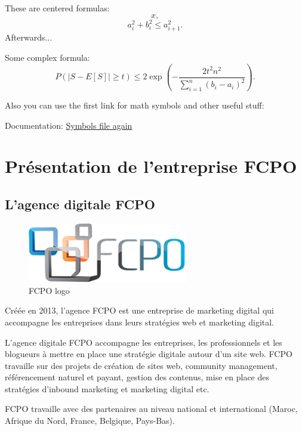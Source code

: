 These are centered formulas: $$x,$$ $$a_i^2 + b_i^2 \le a_{i+1}^2.$$ Afterwards...

Some complex formula: $$P(|S - E[S]| \ge t) \le 2 \exp \left( -\frac{2 t^2 n^2}{\sum_{i = 1}^n (b_i - a_i)^2} \right).$$

Also you can use the first link for math symbols and other useful stuff:

Documentation: \href{https://www.cmor-faculty.rice.edu/~heinken/latex/symbols.pdf}{Symbols file again}



\newpage


\section{Présentation de l’entreprise FCPO}



\subsection{L’agence digitale FCPO}

\begin{figure}[H] 
    \centering
    \includegraphics[width=7cm]{Logos/fcpo.png}
    \caption{FCPO logo}
\end{figure}

\hspace{16pt}Créée en 2013, l'agence FCPO est une entreprise de marketing digital qui
accompagne les entreprises dans leurs stratégies web et marketing digital.

\vspace{12pt}
L’agence digitale FCPO accompagne les entreprises, les professionnels et les
blogueurs à mettre en place une stratégie digitale autour d’un site web. FCPO
travaille sur des projets de création de sites web, community management,
référencement naturel et payant, gestion des contenus, mise en place des
stratégies d’inbound marketing et marketing digital etc.

\vspace{12pt}
FCPO travaille avec des partenaires au niveau national et international
(Maroc, Afrique du Nord, France, Belgique, Pays-Bas).

